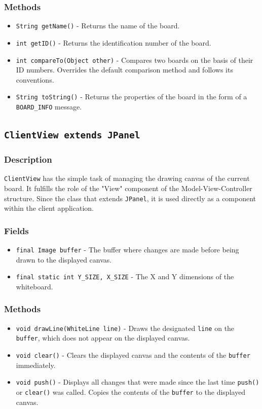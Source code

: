 \subsubsection{Methods}
\begin{itemize}
\item \texttt{String getName()} - Returns the name of the board.
\item \texttt{int getID()} - Returns the identification number of the board.
\item \texttt{int compareTo(Object other)} - Compares two boards on the basis of their ID numbers. Overrides the default comparison method and follows its conventions.
\item \texttt{String toString()} - Returns the properties of the board in the form of a \texttt{BOARD\_INFO} message.
\end{itemize}


\subsection{\texttt{ClientView extends JPanel}}

\subsubsection{Description}
\texttt{ClientView} has the simple task of managing the drawing canvas of the current board. It fulfills the role of the "View" component of the Model-View-Controller structure. Since the class that extends \texttt{JPanel}, it is used directly as a component within the client application.

\subsubsection{Fields}
\begin{itemize}
\item \texttt{final Image buffer} - The buffer where changes are made before being drawn to the displayed canvas.
\item \texttt{final static int Y\_SIZE, X\_SIZE} - The X and Y dimensions of the whiteboard.
\end{itemize}

\subsubsection{Methods}
\begin{itemize}
\item \texttt{void drawLine(WhiteLine line)} - Draws the designated \texttt{line} on the \texttt{buffer}, which does not appear on the displayed canvas.
\item \texttt{void clear()} - Clears the displayed canvas and the contents of the \texttt{buffer} immediately.
\item \texttt{void push()} - Displays all changes that were made since the last time \texttt{push()} or \texttt{clear()} was called. Copies the contents of the \texttt{buffer} to the displayed canvas.
\end{itemize}

